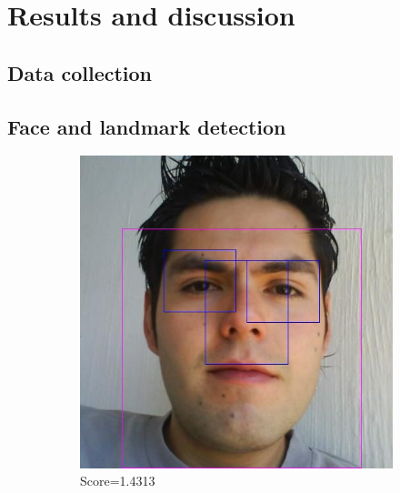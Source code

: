 \chapter{Results and discussion}
\label{results}
\section{Data collection}
\label{results:collection}

\section{Face and landmark detection}
\label{results:fd}

\begin{figure}
    \centering
    \begin{subfigure}[b]{0.3\textwidth}
      \includegraphics[width=\textwidth]{figures/results/detected_cff0618f-f631-4b0d-80d9-f582fee46fad}
      \caption{Score=1.4313}
      \label{fig:results:fd:good_detected1}
    \end{subfigure}
    \begin{subfigure}[b]{0.3\textwidth}

\end{subfigure}
\end{figure}
